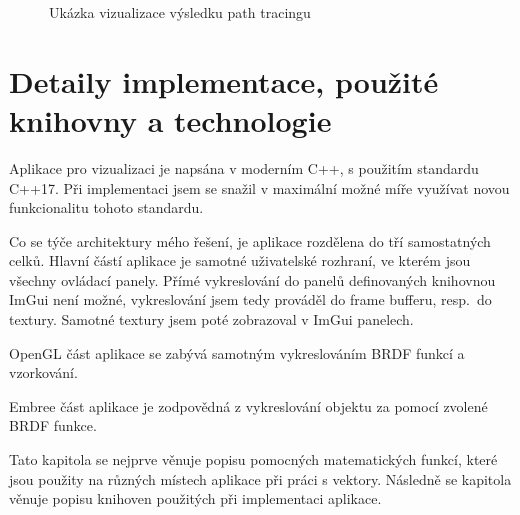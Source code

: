 \documentclass[czech,master]{diploma}
\begin{document}
\begin{figure}[ht]%
  \centering
  \qquad
  \caption{Ukázka vizualizace výsledku path tracingu}%
  \label{fig:finalrender}%
\end{figure}

\clearpage
\section{Detaily implementace, použité knihovny a technologie}
Aplikace pro vizualizaci je napsána v moderním C++, s použitím standardu C++17. Při implementaci jsem se snažil v maximální možné míře využívat novou funkcionalitu tohoto standardu.\par
Co se týče architektury mého řešení, je aplikace rozdělena do tří samostatných celků. Hlavní částí aplikace je samotné uživatelské rozhraní, ve kterém jsou všechny ovládací panely. Přímé vykreslování do panelů definovaných knihovnou ImGui není možné, vykreslování jsem tedy prováděl do frame bufferu, resp.\ do textury. Samotné textury jsem poté zobrazoval v ImGui panelech.\par
OpenGL část aplikace se zabývá samotným vykreslováním BRDF funkcí a vzorkování.\par
Embree část aplikace je zodpovědná z vykreslování objektu za pomocí zvolené BRDF funkce.\par
Tato kapitola se nejprve věnuje popisu pomocných matematických funkcí, které jsou použity na různých místech aplikace při práci s vektory. Následně se kapitola věnuje popisu knihoven použitých při implementaci aplikace.
\end{document}
